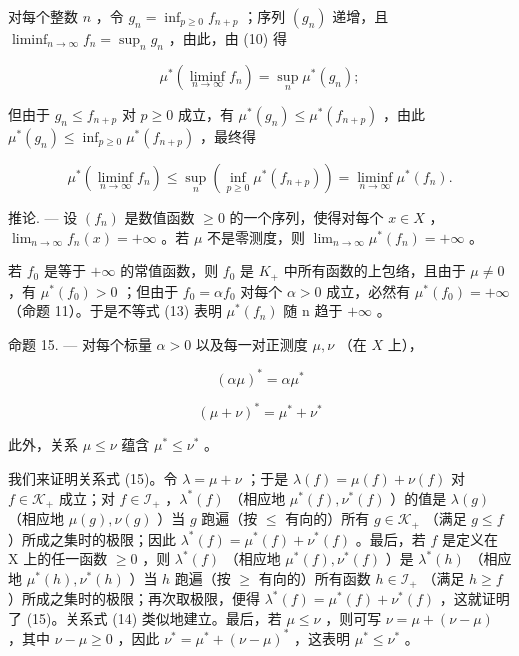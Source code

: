 对每个整数 \(n\) ，令 \(g_{n} = \inf_{p\geqslant 0}f_{n + p}\) ；序列 \((g_n)\) 递增，且 \(\liminf_{n\to \infty}f_n = \sup_n g_n\) ，由此，由 (10) 得

\[
\mu^ {*} (\liminf _ {n \to \infty} f _ {n}) = \sup _ {n} \mu^ {*} (g _ {n});
\]

但由于 \(g_{n} \leqslant f_{n+p}\) 对 \(p \geqslant 0\) 成立，有 \(\mu^{*}(g_{n}) \leqslant \mu^{*}(f_{n+p})\) ，由此 \(\mu^{*}(g_{n}) \leqslant \inf_{p \geqslant 0} \mu^{*}(f_{n+p})\) ，最终得

\[
\mu^ {*} \left(\operatorname * {l i m i n f} _ {n \to \infty} f _ {n}\right) \leqslant \sup _ {n} \left(\inf _ {p \geqslant 0} \mu^ {*} (f _ {n + p})\right) = \operatorname * {l i m i n f} _ {n \to \infty} \mu^ {*} (f _ {n}).
\]

推论. --- 设 \((f_{n})\) 是数值函数 \(\geqslant0\) 的一个序列，使得对每个 \(x\in X\) ，\(\lim_{n\to\infty}f_{n}(x)=+\infty\) 。若 \(\mu\) 不是零测度，则 \(\lim_{n\to\infty}\mu^{*}(f_{n})=+\infty\) 。

若 \(f_{0}\) 是等于 \(+\infty\) 的常值函数，则 \(f_{0}\) 是 \(K_{+}\) 中所有函数的上包络，且由于 \(\mu \neq 0\) ，有 \(\mu^{*}(f_{0}) > 0\) ；但由于 \(f_{0} = \alpha f_{0}\) 对每个 \(\alpha > 0\) 成立，必然有 \(\mu^{*}(f_{0}) = +\infty\) （命题 11）。于是不等式 (13) 表明 \(\mu^{*}(f_{n})\) 随 n 趋于 \(+\infty\) 。

命题 15. --- 对每个标量 \(\alpha > 0\) 以及每一对正测度 \(\mu, \nu\) （在 \(X\) 上），

\[
(\alpha \mu) ^ {*} = \alpha \mu^ {*}\tag{14}
\]

\[
(\mu + \nu) ^ {*} = \mu^ {*} + \nu^ {*}\tag{15}
\]

此外，关系 \(\mu \leqslant \nu\) 蕴含 \(\mu^{*} \leqslant \nu^{*}\) 。

我们来证明关系式 (15)。令 \(\lambda = \mu + \nu\) ；于是 \(\lambda(f) = \mu(f) + \nu(f)\) 对 \(f \in \mathcal{K}_+\) 成立；对 \(f \in \mathcal{I}_+\) ，\(\lambda^*(f)\) （相应地 \(\mu^*(f), \nu^*(f)\) ）的值是 \(\lambda(g)\) （相应地 \(\mu(g), \nu(g)\) ）当 \(g\) 跑遍（按 \(\leqslant\) 有向的）所有 \(g \in \mathcal{K}_+\) （满足 \(g \leqslant f\) ）所成之集时的极限；因此 \(\lambda^*(f) = \mu^*(f) + \nu^*(f)\) 。最后，若 \(f\) 是定义在 X 上的任一函数 \(\geqslant 0\) ，则 \(\lambda^*(f)\) （相应地 \(\mu^*(f), \nu^*(f)\) ）是 \(\lambda^*(h)\) （相应地 \(\mu^*(h), \nu^*(h)\) ）当 \(h\) 跑遍（按 \(\geqslant\) 有向的）所有函数 \(h \in \mathcal{I}_+\) （满足 \(h \geqslant f\) ）所成之集时的极限；再次取极限，便得 \(\lambda^*(f) = \mu^*(f) + \nu^*(f)\) ，这就证明了 (15)。关系式 (14) 类似地建立。最后，若 \(\mu \leqslant \nu\) ，则可写 \(\nu = \mu + (\nu - \mu)\) ，其中 \(\nu - \mu \geqslant 0\) ，因此 \(\nu^* = \mu^* + (\nu - \mu)^*\) ，这表明 \(\mu^* \leqslant \nu^*\) 。

